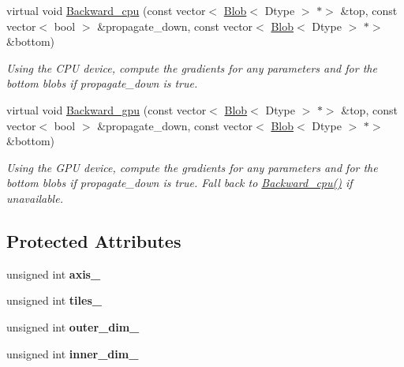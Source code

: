\begin{DoxyCompactItemize}
virtual void \mbox{\hyperlink{classcaffe_1_1_tile_layer_afe3579f4277f46854b35eadb9d6981ad}{Backward\+\_\+cpu}} (const vector$<$ \mbox{\hyperlink{classcaffe_1_1_blob}{Blob}}$<$ Dtype $>$ $\ast$$>$ \&top, const vector$<$ bool $>$ \&propagate\+\_\+down, const vector$<$ \mbox{\hyperlink{classcaffe_1_1_blob}{Blob}}$<$ Dtype $>$ $\ast$$>$ \&bottom)
\begin{DoxyCompactList}\small\item\em Using the C\+PU device, compute the gradients for any parameters and for the bottom blobs if propagate\+\_\+down is true. \end{DoxyCompactList}\item 
\mbox{\label{classcaffe_1_1_tile_layer_ad8ed67bfc8dad624a42a874897714cb2}} 
virtual void \mbox{\hyperlink{classcaffe_1_1_tile_layer_ad8ed67bfc8dad624a42a874897714cb2}{Backward\+\_\+gpu}} (const vector$<$ \mbox{\hyperlink{classcaffe_1_1_blob}{Blob}}$<$ Dtype $>$ $\ast$$>$ \&top, const vector$<$ bool $>$ \&propagate\+\_\+down, const vector$<$ \mbox{\hyperlink{classcaffe_1_1_blob}{Blob}}$<$ Dtype $>$ $\ast$$>$ \&bottom)
\begin{DoxyCompactList}\small\item\em Using the G\+PU device, compute the gradients for any parameters and for the bottom blobs if propagate\+\_\+down is true. Fall back to \mbox{\hyperlink{classcaffe_1_1_tile_layer_a3ca5872f38d740aabf9b132470e9217b}{Backward\+\_\+cpu()}} if unavailable. \end{DoxyCompactList}\end{DoxyCompactItemize}
\subsection*{Protected Attributes}
\begin{DoxyCompactItemize}
\item 
\mbox{\label{classcaffe_1_1_tile_layer_a6035dafd87b7b997e9cef7c1bfaff30a}} 
unsigned int {\bfseries axis\+\_\+}
\item 
\mbox{\label{classcaffe_1_1_tile_layer_aab425e53b5d3d23d76d63d0d23f70bca}} 
unsigned int {\bfseries tiles\+\_\+}
\item 
\mbox{\label{classcaffe_1_1_tile_layer_a2bfae2e8ae3fbe242cbea8ec8740b7a0}} 
unsigned int {\bfseries outer\+\_\+dim\+\_\+}
\item 
\mbox{\label{classcaffe_1_1_tile_layer_a46076f067d0ae4ee65c77381a067b041}} 
unsigned int {\bfseries inner\+\_\+dim\+\_\+}
\end{DoxyCompactItemize}


